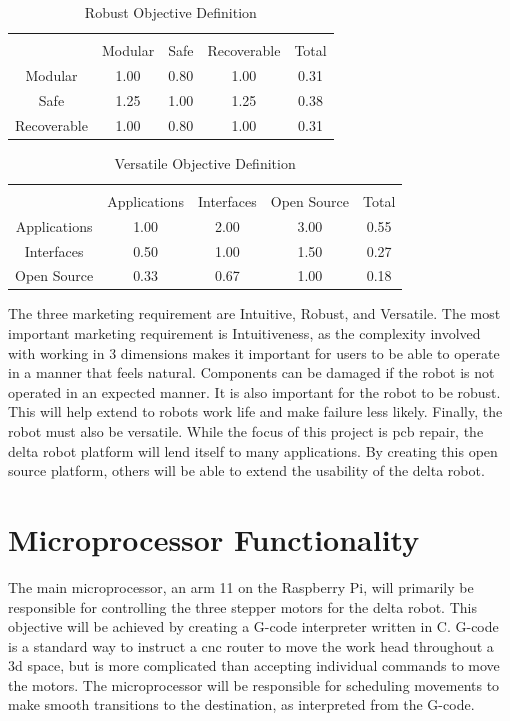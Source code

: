 \begin{table}[ht] 
	\caption{Robust Objective Definition}
	\label{table:robust}
	\centering 
	\begin{tabular}{c c c c c} 
		\hline\hline \\
		 			& Modular 	& Safe 		& Recoverable	& Total\\ 
		Modular	 	& 1.00 		& 0.80		& 1.00 		& 0.31 \\ 
		Safe 		& 1.25		& 1.00 		& 1.25		& 0.38 \\ 
		Recoverable 	& 1.00 		& 0.80 		& 1.00 		& 0.31 \\ 
	\end{tabular} 
\end{table}

\begin{table}[ht] 
	\caption{Versatile Objective Definition}
	\label{table:versatile}
	\centering 
	\begin{tabular}{c c c c c} 
		\hline\hline \\
		 			& Applications& Interfaces	& Open Source	& Total\\ 
		Applications	& 1.00 		& 2.00		& 3.00 		& 0.55 \\ 
		Interfaces	& 0.50		& 1.00 		& 1.50		& 0.27 \\ 
		Open Source 	& 0.33 		& 0.67 		& 1.00 		& 0.18 \\ 
	\end{tabular} 
\end{table}

The three marketing requirement are Intuitive, Robust, and Versatile.
The most important marketing requirement is Intuitiveness, as the complexity involved with working in 3 dimensions makes it important for users to be able to operate in a manner that feels natural.
Components can be damaged if the robot is not operated in an expected manner.
It is also important for the robot to be robust.
This will help extend to robots work life and make failure less likely.
Finally, the robot must also be versatile.
While the focus of this project is \gls{pcb} repair, the delta robot platform will lend itself to many applications.
By creating this open source platform, others will be able to extend the usability of the delta robot.

\section{Microprocessor Functionality}
The main microprocessor, an \gls{arm} 11 on the Raspberry Pi, will primarily be responsible for controlling the three stepper motors for the delta robot.
This objective will be achieved by creating a G-code interpreter written in C.
G-code is a standard way to instruct a \gls{cnc} router to move the work head throughout a \gls{3d} space, but is more complicated than accepting individual commands to move the motors.
The microprocessor will be responsible for scheduling movements to make smooth transitions to the destination, as interpreted from the G-code.

